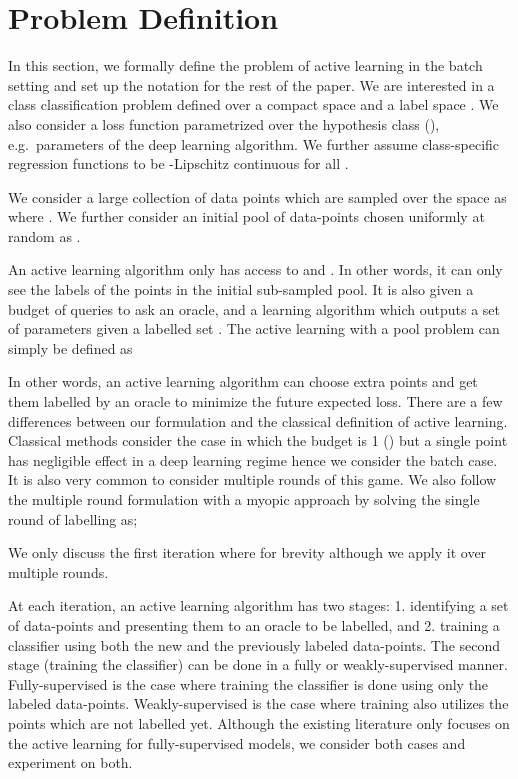\documentclass{article} \usepackage{iclr2018_conference,times}
\begin{document}
\section{Problem Definition} In this section, we formally define the problem of active learning in the batch setting and set
up the notation for the rest of the paper. We are interested in a  class classification problem defined over a
compact space  and a label space  . We also consider a loss function
 parametrized over the hypothesis class
(), e.g.\ parameters of the deep learning algorithm. We further assume class-specific regression functions
 to be \mbox{-Lipschitz} continuous for all .

We consider a large collection of data points which are sampled  over the space
 as \mbox{} where
. We further consider an initial pool of data-points chosen uniformly at random as
\mbox{}.

An active learning algorithm only has access to  and . In other
words, it can only see the labels of the points in the initial sub-sampled pool. It is also given a budget  of
queries to ask an oracle, and a learning algorithm  which outputs a set of parameters  given
a labelled set . The active learning with a pool problem can simply be defined as 

 

In other words, an active learning algorithm can choose  extra points and get them labelled by an oracle to minimize
the future expected loss. There are a few differences between our formulation and the classical definition of active
learning. Classical methods consider the case in which the budget is 1 () but a single point has negligible effect
in a deep learning regime hence we consider the batch case. It is also very common to consider multiple rounds of this
game. We also follow the multiple round formulation with a myopic approach by solving the single round of labelling as;

We only discuss the first iteration where  for brevity although we apply it over multiple rounds. 

At each iteration, an active learning algorithm has two stages: 1. identifying a set of data-points and presenting them
to an oracle to be labelled, and 2. training a classifier using both the new and the previously labeled data-points. The
second stage (training the classifier) can be done in a fully or weakly-supervised manner. Fully-supervised is the case
where training the classifier is done using only the labeled data-points. Weakly-supervised is the case where training
also utilizes the points which are not labelled yet. Although the existing literature only focuses on the active
learning for fully-supervised models, we consider both cases and experiment on both. 
\end{document}
